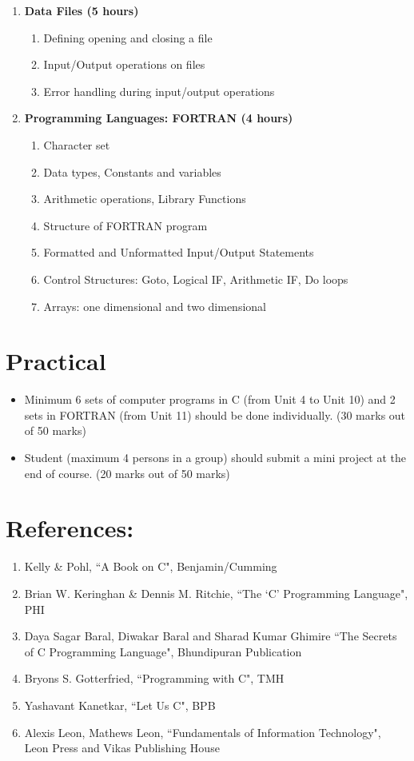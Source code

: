 \begin{enumerate}
    \item \textbf{ Data Files \hfill (5 hours)}
    \begin{enumerate}
        \item Defining opening and closing a file
        \item Input/Output operations on files
        \item Error handling during input/output operations
    \end{enumerate} 
    
    \item \textbf{ Programming Languages: FORTRAN \hfill (4 hours)}
    \begin{enumerate}
        \item Character set
        \item Data types, Constants and variables
        \item Arithmetic operations, Library Functions
        \item Structure of FORTRAN program
        \item Formatted and Unformatted Input/Output Statements
        \item Control Structures: Goto, Logical IF, Arithmetic IF, Do loops
        \item Arrays: one dimensional and two dimensional
    \end{enumerate}
\end{enumerate}

\section*{Practical}
\begin{itemize}
    \item Minimum 6 sets of computer programs in C (from Unit 4 to Unit 10) and 2 sets in FORTRAN (from Unit 11) should be done individually. (30 marks out of 50 marks)
    \item Student (maximum 4 persons in a group) should submit a mini project at the end of course. (20 marks out of 50 marks)
\end{itemize}

\section*{References:}
\begin{enumerate}
    \item Kelly \& Pohl, ``A Book on C", Benjamin/Cumming
    \item Brian W. Keringhan \& Dennis M. Ritchie, ``The `C' Programming Language", PHI
    \item Daya Sagar Baral, Diwakar Baral and Sharad Kumar Ghimire ``The Secrets of C Programming Language", Bhundipuran Publication
    \item Bryons S. Gotterfried, ``Programming with C", TMH
    \item Yashavant Kanetkar, ``Let Us C", BPB
    \item Alexis Leon, Mathews Leon, ``Fundamentals of Information Technology", Leon Press and Vikas Publishing House
\end{enumerate}